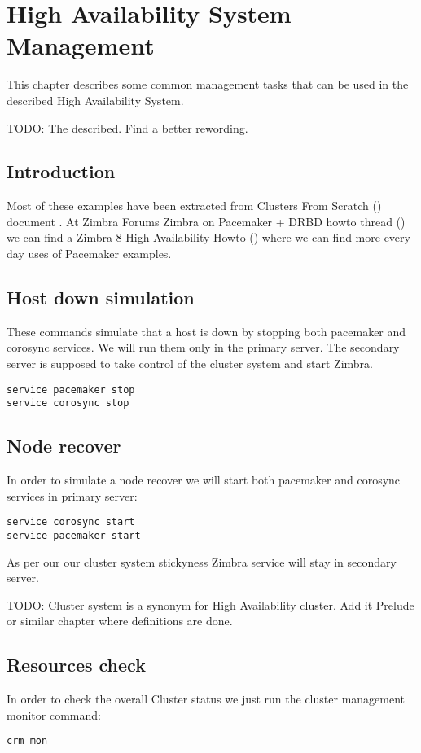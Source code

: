 

\chapter{High Availability System Management}
\label{chap:ha-system-management}
This chapter describes some common management tasks that can be used in the described High Availability System.

TODO: The described. Find a better rewording.

\section {Introduction}
Most of these examples have been extracted from Clusters From Scratch (\cite{ClustersFromScratch}) document . At Zimbra Forums Zimbra on Pacemaker + DRBD howto thread (\cite{ZForumsTaer}) we can find a Zimbra 8 High Availability Howto (\cite{TaerHowtoHAZimbra8}) where we can find more every-day uses of Pacemaker examples.

\section {Host down simulation}
These commands simulate that a host is down by stopping both pacemaker and corosync services. We will run them only in the primary server. The secondary server is supposed to take control of the cluster system and start Zimbra.

\begin{verbatim}
service pacemaker stop
service corosync stop
\end{verbatim}

\section {Node recover}
In order to simulate a node recover we will start both pacemaker and corosync services in primary server:
\begin{verbatim}
service corosync start
service pacemaker start
\end{verbatim}

As per our our cluster system stickyness Zimbra service will stay in secondary server.


TODO: Cluster system is a synonym for High Availability cluster. Add it Prelude or similar chapter where definitions are done.

\section {Resources check}
In order to check the overall Cluster status we just run the cluster management monitor command:
\begin{verbatim}
crm_mon
\end{verbatim}

